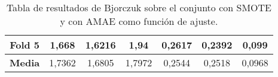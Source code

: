 \begin{table}[H]
{\begin{tabular}{|ccccccc|}
\multicolumn{1}{|c|}{\textbf{Fold 5}} & \multicolumn{1}{c|}{1,668}             & \multicolumn{1}{c|}{1,6216}              & \multicolumn{1}{c|}{1,94}           & \multicolumn{1}{c|}{0,2617}            & \multicolumn{1}{c|}{0,2392}              & 0,099          \\ \hline
\multicolumn{1}{|c|}{\textbf{Media}}  & \multicolumn{1}{c|}{1,7362}           & \multicolumn{1}{c|}{1,6805}             & \multicolumn{1}{c|}{1,7972}        & \multicolumn{1}{c|}{0,2544}           & \multicolumn{1}{c|}{0,2518}              & 0,0968        \\ \hline
\end{tabular}%
}
\caption{Tabla de resultados de Bjorczuk sobre el conjunto con SMOTE y con AMAE como función de ajuste.}\label{tablaBJORCZUKconSMOTEconAMAE}
\end{table}


